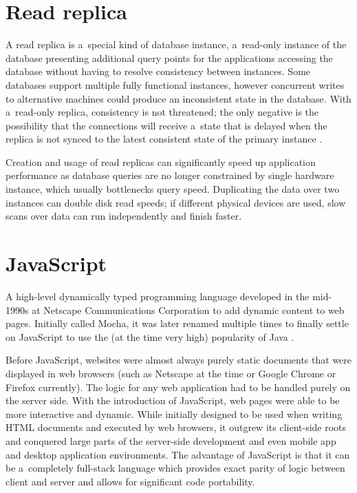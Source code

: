 \section*{Read replica}
A read replica is a~special kind of database instance, a~read-only instance of
the database presenting additional query points for the applications accessing
the database without having to resolve consistency between instances. Some
databases support multiple fully functional instances, however concurrent writes
to alternative machines could produce an inconsistent state in the database.
With a~read-only replica, consistency is not threatened; the only negative is
the possibility that the connections will receive a~state that is delayed when
the replica is not synced to the latest consistent state of the primary instance
\cite{postgres-availability}.

Creation and usage of read replicas can significantly speed up application
performance as database queries are no longer constrained by single hardware
instance, which usually bottlenecks query speed. Duplicating the data over two
instances can double disk read speeds; if different physical devices are used,
slow scans over data can run independently and finish faster.


\section*{JavaScript}
A high-level dynamically typed programming language developed in the mid-1990s
at Netscape Communications Corporation to add dynamic content to web pages.
Initially called Mocha, it was later renamed multiple times to finally settle on
JavaScript to use the (at the time very high) popularity of Java
\cite{auth0JavascriptHistory}.

Before JavaScript, websites were almost always purely static documents that were
displayed in web browsers (such as Netscape at the time or Google Chrome or
Firefox currently). The logic for any web application had to be handled purely
on the server side. With the introduction of JavaScript, web pages were able to
be more interactive and dynamic. While initially designed to be used when
writing HTML documents and executed by web browsers, it outgrew its client-side
roots and conquered large parts of the server-side development and even mobile
app and desktop application environments. The advantage of JavaScript is that it
can be a~completely full-stack language which provides exact parity of logic
between client and server and allows for significant code portability.

